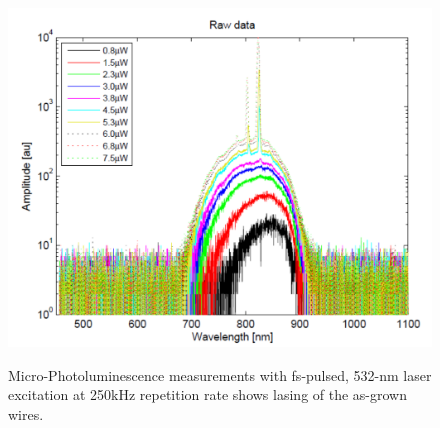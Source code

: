 \begin{figure}
  \caption{Micro-Photoluminescence measurements with fs-pulsed, 532-nm laser excitation at 250kHz repetition rate shows lasing of the as-grown wires.}
  \centering
  \includegraphics[width=\textwidth]{pictures/Data/lasing}
  \label{lasing}
\end{figure}
